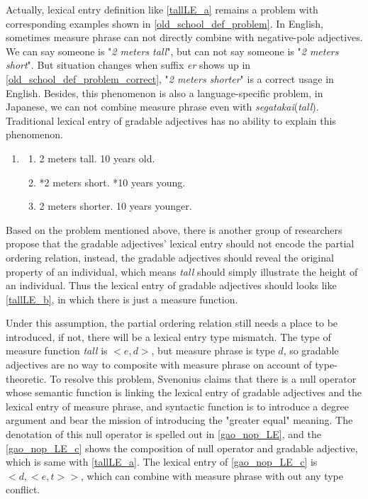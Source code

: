 \documentclass{ctexart}
\let \cite \parencite
\begin{document}
Actually, lexical entry definition like \ref{tallLE_a} remains a problem with corresponding examples shown in \ref{old_school_def_problem}. In English, sometimes measure phrase can not directly combine with negative-pole adjectives. We can say someone is "\textit{2 meters tall}", but can not say someone is "\textit{2 meters short}". But situation changes when suffix \textit{er} shows up in \ref{old_school_def_problem_correct}, "\textit{2 meters shorter}" is a correct usage in English. Besides, this phenomenon is also a language-specific problem, in Japanese, we can not combine measure phrase even with \textit{segatakai}(\textit{tall}). Traditional lexical entry of gradable adjectives has no ability to explain this phenomenon.

\begin{enumerate}[resume]

    \item \label{old_school_def_problem}
    
    \begin{enumerate}[ref=(\arabic{enumi}\alph*)]
        
        \item 2 meters tall. 10 years old.
        \item *2 meters short. *10 years young.
        \item \label{old_school_def_problem_correct} 2 meters shorter. 10 years younger.

    \end{enumerate}

\end{enumerate}

Based on the problem mentioned above, there is another group of researchers propose that the gradable adjectives' lexical entry should not encode the partial ordering relation, instead, the gradable adjectives should reveal the original property of an individual, which means \textit{tall} should simply illustrate the height of an individual. Thus the lexical entry of gradable adjectives should looks like \ref{tallLE_b}, in which there is just a measure function. 

Under this assumption, the partial ordering relation still needs a place to be introduced, if not, there will be a lexical entry type mismatch. The type of measure function \textit{tall} is $<e,d>$, but measure phrase is type $d$, so gradable adjectives are no way to composite with measure phrase on account of type-theoretic. To resolve this problem, Svenonius\cite{svenonius2006} claims that there is a null operator whose semantic function is linking the lexical entry of gradable adjectives and the lexical entry of measure phrase, and syntactic function is to introduce a degree argument and bear the mission of introducing the "greater equal" meaning. The denotation of this null operator is spelled out in \ref{gao_nop_LE}, and the \ref{gao_nop_LE_c} shows the composition of null operator and gradable adjective, which is same with \ref{tallLE_a}. The lexical entry of \ref{gao_nop_LE_c} is $<d,<e,t>>$, which can combine with measure phrase with out any type conflict.
\end{document}
